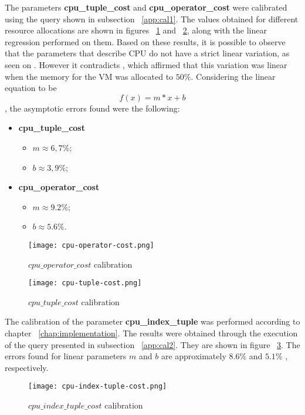 The parameters \textbf{cpu\_tuple\_cost} and \textbf{cpu\_operator\_cost} were calibrated using the query shown in subsection ~\ref{app:cal1}. The values obtained for different resource allocations are shown in figures ~\ref{fig:cpuop} and ~\ref{fig:cputp}, along with the linear regression performed on them. Based on these results, it is possible to observe that the parameters that describe CPU do not have a strict linear variation, as seen on  \cite{4401021}. However it contradicts  \cite{Soror:2008:AVM:1376616.1376711}, which affirmed that this variation was linear when the memory for the VM was allocated to $50\%$. Considering the linear equation to be
\[
 f(x) = m*x + b
\],
the asymptotic errors found were the following:
\begin{itemize}
 \item \textbf{cpu\_tuple\_cost}
 \begin{itemize}
  \item $m \approx 6,7\% $;
  \item $b \approx 3,9\% $;
 \end{itemize}
  \item \textbf{cpu\_operator\_cost}
 \begin{itemize}
  \item $m \approx 9.2\% $;
  \item $b \approx 5.6\% $.
 \end{itemize}
\end{itemize}

 
 \begin{figure}[ht]
 \centering
 \texttt{[image: cpu-operator-cost.png]}
 \caption{$cpu\_operator\_cost$ calibration}
 \label{fig:cpuop}
 \end{figure} 
% 
% 
 \begin{figure}[ht]
 \centering
 \texttt{[image: cpu-tuple-cost.png]}
 \caption{$cpu\_tuple\_cost$ calibration}
 \label{fig:cputp}
 \end{figure} 
 
 The calibration of the parameter \textbf{cpu\_index\_tuple} was performed according to chapter ~\ref{chap:implementation}. The results were obtained through the execution of the query presented in subsection ~\ref{app:cal2}. They are shown in figure ~\ref{fig:cpuip}. The errors found for linear parameters $m$ and $b$ are approximately $8.6\%$ and $5.1\%$ , respectively.

 \begin{figure}[ht]
 \centering
 \texttt{[image: cpu-index-tuple-cost.png]}
 \caption{$cpu\_index\_tuple\_cost$ calibration}
 \label{fig:cpuip}
 \end{figure} 
 
